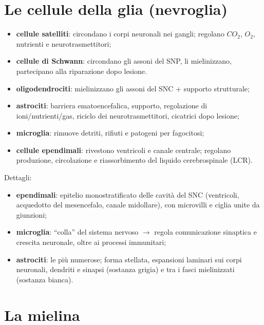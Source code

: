 \section{Le cellule della glia (nevroglia)}

\begin{itemize}
  \item \textbf{cellule satelliti}: circondano i corpi neuronali nei gangli; regolano $CO_2$,
    $O_2$, nutrienti e neurotrasmettitori;
  \item \textbf{cellule di Schwann}: circondano gli assoni del SNP, li mielinizzano, partecipano
    alla riparazione dopo lesione.
\end{itemize}
\begin{itemize}
  \item \textbf{oligodendrociti}: mielinizzano gli assoni del SNC + supporto strutturale;
  \item \textbf{astrociti}: barriera ematoencefalica, supporto, regolazione di ioni/nutrienti/gas,
    riciclo dei neurotrasmettitori, cicatrici dopo lesione;
  \item \textbf{microglia}: rimuove detriti, rifiuti e patogeni per fagocitosi;
  \item \textbf{cellule ependimali}: rivestono ventricoli e canale centrale; regolano produzione,
    circolazione e riassorbimento del liquido cerebrospinale (LCR).
\end{itemize}
Dettagli:
\begin{itemize}
  \item \textbf{ependimali}: epitelio monostratificato delle cavità del SNC (ventricoli, acquedotto
    del mesencefalo, canale midollare), con microvilli e ciglia unite da giunzioni;
  \item \textbf{microglia}: ``colla'' del sistema nervoso $\rightarrow$ regola comunicazione
    sinaptica e crescita neuronale, oltre ai processi immunitari;
  \item \textbf{astrociti}: le più numerose; forma stellata, espansioni laminari sui corpi
    neuronali, dendriti e sinapsi (sostanza grigia) e tra i fasci mielinizzati (sostanza bianca).
\end{itemize}

\section{La mielina}

